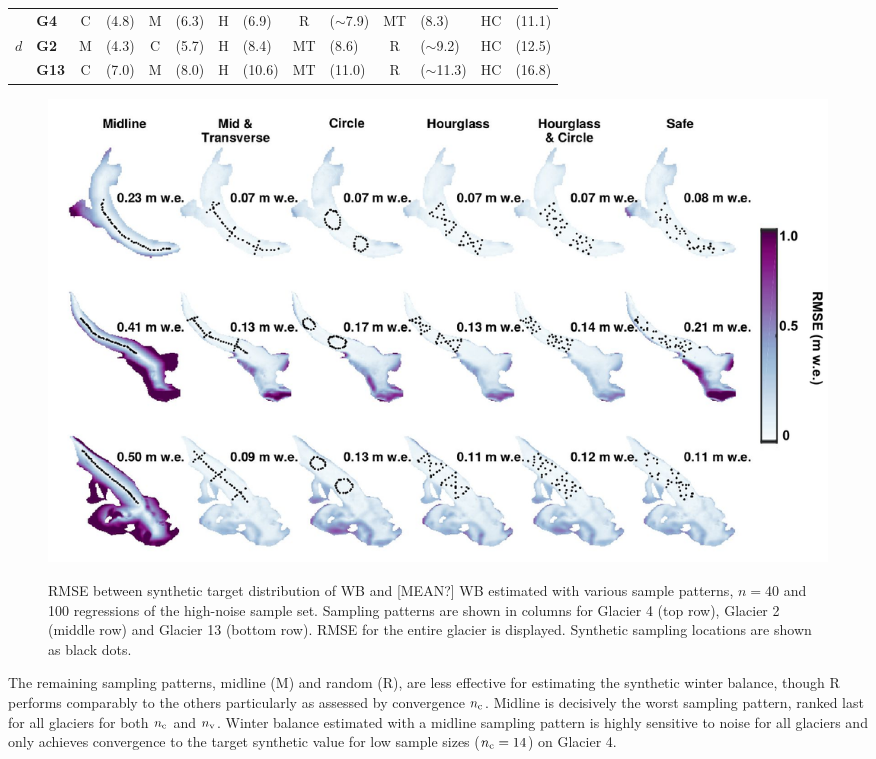 \documentclass[twocolumn,letterpaper]{igs}
\begin{document}
\begin{table}[]
\begin{tabular}{clclclclclclcl}
\hline
                & \textbf{G4}   & \textcolor{C}{C}         & (4.8) & \textcolor{M}{M}         & (6.3) & \textcolor{H}{H}                 & (6.9)         & \textcolor{R}{R}         & ($\sim$7.9) & \textcolor{MT}{MT}         & (8.3) & \textcolor{HC}{HC} & (11.1) \\
$d$        & \textbf{G2}   & \textcolor{M}{M}         & (4.3) & \textcolor{C}{C}         & (5.7) & \textcolor{H}{H}                 & (8.4)         & \textcolor{MT}{MT} & (8.6)         & \textcolor{R}{R}                 & ($\sim$9.2) & \textcolor{HC}{HC} & (12.5) \\
                & \textbf{G13} & \textcolor{C}{C}         & (7.0) & \textcolor{M}{M}         & (8.0) & \textcolor{H}{H}                 & (10.6)         & \textcolor{MT}{MT} & (11.0)         & \textcolor{R}{R}                 & ($\sim$11.3) & \textcolor{HC}{HC} & (16.8)\\
\hline
\end{tabular}
\end{table}


\begin{figure}
	\centering
	\includegraphics[width =\textwidth]{SynObsRMSEmap.pdf}\\
	\caption{RMSE between synthetic target distribution of WB and [MEAN?] WB estimated with various sample patterns, $n=40$ and 100 regressions of the high-noise sample set. Sampling patterns are shown in columns for Glacier 4 (top row), Glacier 2 (middle row) and Glacier 13 (bottom row). RMSE for the entire glacier is displayed. Synthetic sampling locations are shown as black dots.}
	\label{fig:SynObsRMSEmap}
\end{figure}


The remaining sampling patterns, midline (M) and random (R), are less effective for estimating the synthetic winter balance, though R performs comparably to the others particularly as assessed by convergence $n_{\rm c}$. 
Midline is decisively the worst sampling pattern, ranked last for all glaciers for both $n_{\rm c}$ and $n_{\rm v}$. Winter balance estimated with a midline sampling pattern is highly sensitive to noise for all glaciers and only achieves convergence to the target synthetic value for low sample sizes ($n_{\rm c}=14$) on Glacier 4. 
\end{document}
